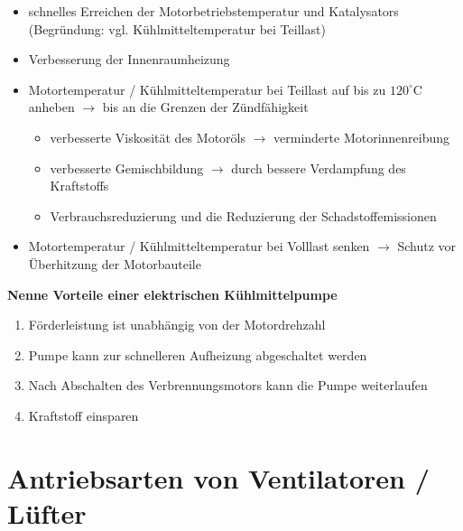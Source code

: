 \begin{itemize}
\item
  schnelles Erreichen der Motorbetriebstemperatur und Katalysators
  (Begründung: vgl. Kühlmitteltemperatur bei Teillast)
\item
  Verbesserung der Innenraumheizung
\item
  Motortemperatur / Kühlmitteltemperatur bei Teillast auf bis zu
  $120^\circ\text{C}$ anheben $\to$ bis an die Grenzen der
  Zündfähigkeit

  \begin{itemize}
  \item
    verbesserte Viskosität des Motoröls $\to$ verminderte
    Motorinnenreibung
  \item
    verbesserte Gemischbildung $\to$ durch bessere Verdampfung des
    Kraftstoffs
  \item
    Verbrauchsreduzierung und die Reduzierung der Schadstoffemissionen
  \end{itemize}
\item
  Motortemperatur / Kühlmitteltemperatur bei Volllast senken $\to$
  Schutz vor Überhitzung der Motorbauteile
\end{itemize}

\textbf{Nenne Vorteile einer elektrischen Kühlmittelpumpe}

\begin{enumerate}
\item
  Förderleistung ist unabhängig von der Motordrehzahl
\item
  Pumpe kann zur schnelleren Aufheizung abgeschaltet werden
\item
  Nach Abschalten des Verbrennungsmotors kann die Pumpe weiterlaufen
\item
  Kraftstoff einsparen
\end{enumerate}

\newpage

\section{Antriebsarten von Ventilatoren /
Lüfter}\label{antriebsarten-von-ventilatoren-luefter}


